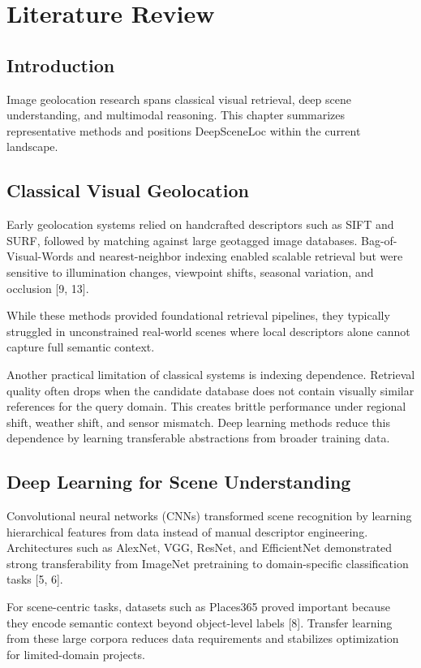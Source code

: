 \chapter{Literature Review}

\section{Introduction}
Image geolocation research spans classical visual retrieval, deep scene understanding, and multimodal reasoning. This chapter summarizes representative methods and positions DeepSceneLoc within the current landscape.

\section{Classical Visual Geolocation}
Early geolocation systems relied on handcrafted descriptors such as SIFT and SURF, followed by matching against large geotagged image databases. Bag-of-Visual-Words and nearest-neighbor indexing enabled scalable retrieval but were sensitive to illumination changes, viewpoint shifts, seasonal variation, and occlusion [9, 13].

While these methods provided foundational retrieval pipelines, they typically struggled in unconstrained real-world scenes where local descriptors alone cannot capture full semantic context.

Another practical limitation of classical systems is indexing dependence. Retrieval quality often drops when the candidate database does not contain visually similar references for the query domain. This creates brittle performance under regional shift, weather shift, and sensor mismatch. Deep learning methods reduce this dependence by learning transferable abstractions from broader training data.

\section{Deep Learning for Scene Understanding}
Convolutional neural networks (CNNs) transformed scene recognition by learning hierarchical features from data instead of manual descriptor engineering. Architectures such as AlexNet, VGG, ResNet, and EfficientNet demonstrated strong transferability from ImageNet pretraining to domain-specific classification tasks [5, 6].

For scene-centric tasks, datasets such as Places365 proved important because they encode semantic context beyond object-level labels [8]. Transfer learning from these large corpora reduces data requirements and stabilizes optimization for limited-domain projects.

